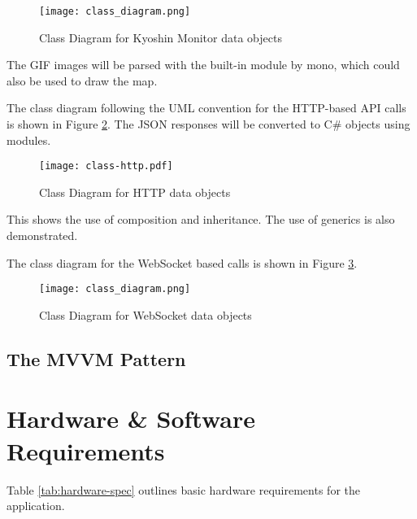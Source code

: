 \begin{figure}[htp]
    \centering
    \texttt{[image: class\_diagram.png]}
    \caption{Class Diagram for Kyoshin Monitor data objects}
    \label{fig:classes-kmoni}
\end{figure}

The GIF images will be parsed with the built-in  module by mono, which could also be used to draw the map.

The class diagram following the UML convention for the HTTP-based API calls is shown in Figure \ref{fig:classes-http}. The JSON responses will be converted to C\# objects using  modules.

\begin{figure}[htp]
    \centering
    \texttt{[image: class-http.pdf]}
    \caption{Class Diagram for HTTP data objects}
    \label{fig:classes-http}
\end{figure}

This shows the use of composition and inheritance. The use of generics is also demonstrated.

The class diagram for the WebSocket based calls is shown in Figure \ref{fig:classes-ws}.

\begin{figure}[htp]
    \centering
    \texttt{[image: class\_diagram.png]}
    \caption{Class Diagram for WebSocket data objects}
    \label{fig:classes-ws}
\end{figure}

\subsection{The MVVM Pattern}

\section{Hardware \& Software Requirements}

Table \ref{tab:hardware-spec} outlines basic hardware requirements for the application.


